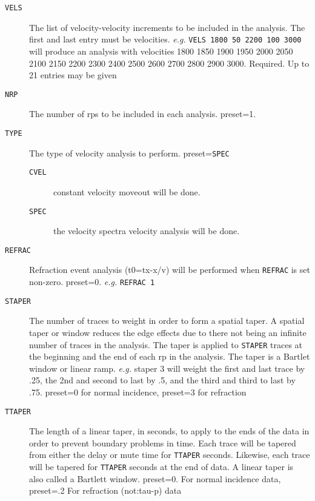 \begin{description}
\item[\texttt{VELS}] The list of velocity-velocity increments to be included in the
          analysis.  The first and last entry must be velocities.
          \textit{e.g.} \texttt{VELS 1800 50 2200 100 3000} will produce an analysis with
          velocities 1800 1850 1900 1950 2000 2050 2100 2150 2200
          2300 2400 2500 2600 2700 2800 2900 3000.
          Required.  Up to 21 entries may be given

\item[\texttt{NRP}] The number of \glspl{rp} to be included in each analysis.  \Gls{preset}=1.

\item[\texttt{TYPE}] The type of velocity analysis to perform.  \Gls{preset}=\texttt{SPEC}
\begin{description}
    \item[\texttt{CVEL}]  constant velocity moveout will be done.
    \item[\texttt{SPEC}]  the velocity spectra velocity analysis will be done.
\end{description}

\item[\texttt{REFRAC}] Refraction event analysis (t0=tx-x/v) will be performed when
         \texttt{REFRAC} is set non-zero.
         \Gls{preset}=0.  \textit{e.g.} \texttt{REFRAC 1}

\item[\texttt{STAPER}] The number of traces to weight in order to form a spatial
         taper.  A spatial taper or window reduces the edge effects due
         to there not being an infinite number of traces in the
         analysis.  The taper is applied to \texttt{STAPER} traces at the
         beginning and the end of each \gls{rp} in the analysis.  The taper
         is a Bartlet window or linear ramp.  \textit{e.g.} staper 3 will weight
         the first and last trace by .25, the 2nd and second to last by
         .5, and the third and third to last by .75.
         \Gls{preset}=0 for normal incidence,
         \Gls{preset}=3 for refraction

\item[\texttt{TTAPER}] The length of a linear taper, in seconds, to apply to the ends
         of the data in order to prevent boundary problems in time.
         Each trace will be tapered from either the delay or mute time
         for \texttt{TTAPER} seconds.  Likewise, each trace will be tapered for
         \texttt{TTAPER} seconds at the end of data.  A linear taper is also
         called a Bartlett window.
         \Gls{preset}=0. For normal incidence data,
         \Gls{preset}=.2 For refraction (\gls{not:tau}-p) data
\end{description}


